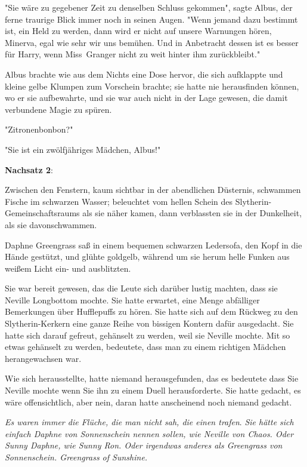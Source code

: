 {"Sie wäre zu gegebener Zeit zu denselben Schluss gekommen", sagte Albus, der ferne traurige Blick immer noch in seinen Augen. "Wenn jemand dazu bestimmt ist, ein Held zu werden, dann wird er nicht auf unsere Warnungen hören, Minerva, egal wie sehr wir uns bemühen. Und in Anbetracht dessen ist es besser für Harry, wenn Miss~Granger nicht zu weit hinter ihm zurückbleibt."

Albus brachte wie aus dem Nichts eine Dose hervor, die sich aufklappte und kleine gelbe Klumpen zum Vorschein brachte; sie hatte nie herausfinden können, wo er sie aufbewahrte, und sie war auch nicht in der Lage gewesen, die damit verbundene Magie zu spüren.

"Zitronenbonbon?"

"Sie ist ein zwölfjähriges Mädchen, Albus!"

\textbf{Nachsatz 2}:

Zwischen den Fenstern, kaum sichtbar in der abendlichen Düsternis, schwammen Fische im schwarzen Wasser; beleuchtet vom hellen Schein des Slytherin-Gemeinschaftsraums als sie näher kamen, dann verblassten sie in der Dunkelheit, als sie davonschwammen.

Daphne Greengrass saß in einem bequemen schwarzen Ledersofa, den Kopf in die Hände gestützt, und glühte goldgelb, während um sie herum helle Funken aus weißem Licht ein- und ausblitzten.

Sie war bereit gewesen, das die Leute sich darüber lustig machten, dass sie Neville Longbottom mochte. Sie hatte erwartet, eine Menge abfälliger Bemerkungen über Hufflepuffs zu hören. Sie hatte sich auf dem Rückweg zu den Slytherin-Kerkern eine ganze Reihe von bissigen Kontern dafür ausgedacht. Sie hatte sich darauf gefreut, gehänselt zu werden, weil sie Neville mochte. Mit so etwas gehänselt zu werden, bedeutete, dass man zu einem richtigen Mädchen herangewachsen war.

Wie sich herausstellte, hatte niemand herausgefunden, das es bedeutete dass Sie Neville mochte wenn Sie ihn zu einem Duell herausforderte. Sie hatte gedacht, es wäre offensichtlich, aber nein, daran hatte anscheinend noch niemand gedacht.

\emph{Es waren immer die Flüche, die man nicht sah, die einen trafen}. \emph{Sie hätte sich einfach Daphne von Sonnenschein nennen sollen, wie Neville von Chaos. Oder Sunny Daphne, wie Sunny Ron. Oder irgendwas anderes als Greengrass von Sonnenschein. Greengrass of Sunshine.}

}
